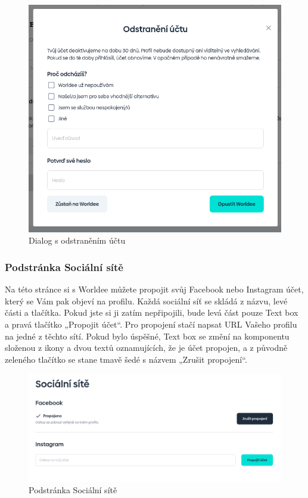 \begin{figure}
    \centering
    \includegraphics[width=1\linewidth]{obrazky/delete_account.png}
    \caption{Dialog s odstraněním účtu}
\end{figure}


\newpage
\subsubsection{Podstránka Sociální sítě}
Na této stránce si s Worldee můžete propojit svůj Facebook nebo Instagram účet, který se Vám pak objeví na profilu. Každá sociální síť se skládá z názvu, levé části a tlačítka. Pokud jste si ji zatím nepřipojili, bude levá část pouze Text box a pravá tlačítko „Propojit účet“. Pro propojení stačí napsat URL Vašeho profilu na jedné z těchto sítí. Pokud bylo úspěšné, Text box se změní na komponentu složenou z ikony a dvou textů oznamujících, že je účet propojen, a z původně zeleného tlačítko se stane tmavě šedé s názvem „Zrušit propojení“.

\begin{figure}[!h]
    \centering
    \includegraphics[width=1\linewidth]{obrazky/social_networks.png}
    \caption{Podstránka Sociální sítě}
\end{figure}


